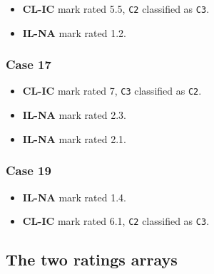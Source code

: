 \documentclass[
]{book}
\newenvironment{Shaded}{\begin{snugshade}}{\end{snugshade}}
\newcommand{\CommentTok}[1]{\textcolor[rgb]{0.56,0.35,0.01}{\textit{#1}}}
\newcommand{\DataTypeTok}[1]{\textcolor[rgb]{0.13,0.29,0.53}{#1}}
\newcommand{\DecValTok}[1]{\textcolor[rgb]{0.00,0.00,0.81}{#1}}
\newcommand{\KeywordTok}[1]{\textcolor[rgb]{0.13,0.29,0.53}{\textbf{#1}}}
\newcommand{\NormalTok}[1]{#1}
\newcommand{\OperatorTok}[1]{\textcolor[rgb]{0.81,0.36,0.00}{\textbf{#1}}}
\newcommand{\StringTok}[1]{\textcolor[rgb]{0.31,0.60,0.02}{#1}}
\providecommand{\tightlist}{%
  \setlength{\itemsep}{0pt}\setlength{\parskip}{0pt}}
\begin{document}
\begin{itemize}
\tightlist
\item
  \textbf{CL-IC} mark rated 5.5, \texttt{C2} classified as \texttt{C3}.
\item
  \textbf{IL-NA} mark rated 1.2.
\end{itemize}

\hypertarget{classification-tasks-example1-fp-case17}{%
\subsubsection{Case 17}\label{classification-tasks-example1-fp-case17}}

\begin{itemize}
\tightlist
\item
  \textbf{CL-IC} mark rated 7, \texttt{C3} classified as \texttt{C2}.
\item
  \textbf{IL-NA} mark rated 2.3.
\item
  \textbf{IL-NA} mark rated 2.1.
\end{itemize}

\hypertarget{classification-tasks-example1-fp-case19}{%
\subsubsection{Case 19}\label{classification-tasks-example1-fp-case19}}

\begin{itemize}
\tightlist
\item
  \textbf{IL-NA} mark rated 1.4.
\item
  \textbf{CL-IC} mark rated 6.1, \texttt{C2} classified as \texttt{C3}.
\end{itemize}

\hypertarget{the-two-ratings-arrays}{%
\subsection{The two ratings arrays}\label{the-two-ratings-arrays}}

\begin{Shaded}
\end{Shaded}
\end{document}
